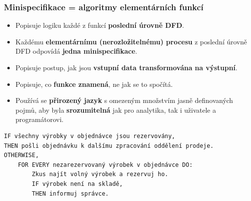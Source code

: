 \subsubsection{Minispecifikace = algoritmy elementárních funkcí}
\begin{itemize}
\item Popisuje logiku každé z funkcí \textbf{poslední úrovně DFD}.
\item Každému \textbf{elementárnímu (nerozložitelnému) procesu} z poslední úrovně DFD odpovídá \textbf{jedna minispecifikace}.
\item Popisuje postup, jak jsou \textbf{vstupní data transformována na výstupní}.
\item Popisuje, co \textbf{funkce znamená}, ne jak se to spočítá.
\item Používá se \textbf{přirozený jazyk} s omezeným množstvím jasně definovaných pojmů, aby byla \textbf{srozumitelná} jak pro analytika, tak i uživatele a programátorovi.
\end{itemize}

\smallskip
\begin{verbatim}
IF všechny výrobky v objednávce jsou rezervovány,
THEN pošli objednávku k dalšímu zpracování oddělení prodeje.
OTHERWISE,
	FOR EVERY nezarezervovaný výrobek v objednávce DO:
		Zkus najít volný výrobek a rezervuj ho.
		IF výrobek není na skladě,
		THEN informuj správce.
\end{verbatim}